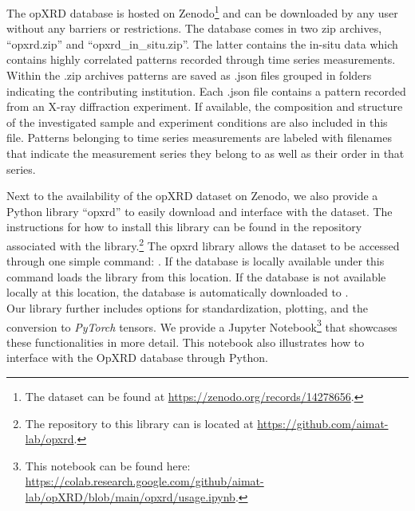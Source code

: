 The opXRD database is hosted on Zenodo\footnote{The dataset can be found at \url{https://zenodo.org/records/14278656}.} and can be downloaded by any user without any barriers or restrictions. The database comes in two zip archives, ``opxrd.zip'' and ``opxrd\_in\_situ.zip''. The latter contains the in-situ data which contains highly correlated patterns recorded through time series measurements. Within the .zip archives patterns are saved as .json files grouped in folders indicating the contributing institution. Each .json file contains a pattern recorded from an X-ray diffraction experiment. If available, the composition and structure of the investigated sample and experiment conditions are also included in this file. Patterns belonging to time series measurements are labeled with filenames that indicate the measurement series they belong to as well as their order in that series.

Next to the availability of the opXRD dataset on Zenodo, we also provide a Python library ``opxrd'' to easily download and interface with the dataset. The instructions for how to install this library can be found in the repository associated with the library.\footnote{The repository to this library can is located at \url{https://github.com/aimat-lab/opxrd}.} The opxrd library allows the dataset to be accessed through one simple command: . If the database is locally available under  this command loads the library from this location. If the database is not available locally at this location, the database is automatically downloaded to . \\

Our library further includes options for standardization, plotting, and the conversion to \emph{PyTorch} tensors. We provide a Jupyter Notebook\footnote{This notebook can be found here: \url{https://colab.research.google.com/github/aimat-lab/opXRD/blob/main/opxrd/usage.ipynb}.} that showcases these functionalities in more detail. This notebook also illustrates how to interface with the OpXRD database through Python. 